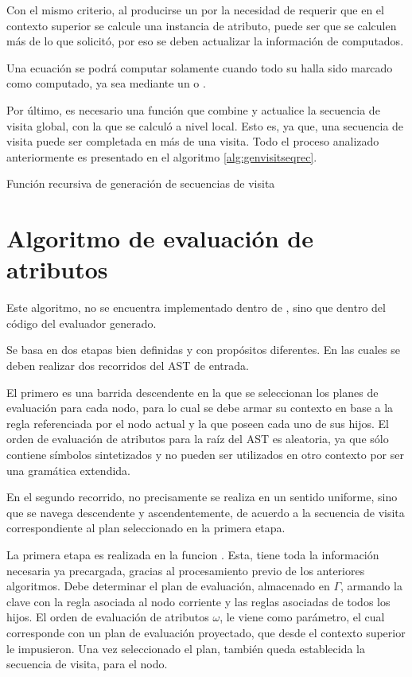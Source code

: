 Con el mismo criterio, al producirse un  por la necesidad de requerir que en el contexto superior se calcule una instancia de atributo, puede ser que se calculen más de lo que solicitó, por eso se deben actualizar la información de computados.

Una ecuación se podrá computar solamente cuando todo su  halla sido marcado como computado, ya sea mediante un  o .

Por último, es necesario una función que combine y actualice la secuencia de visita global, con la que se calculó a nivel local. Esto es, ya que, una secuencia de visita puede ser completada en más de una visita. Todo el proceso analizado anteriormente es presentado en el algoritmo \ref{alg:genvisitseqrec}.

\begin{algorithm}[!ht]

\caption{\label{alg:genvisitseqrec} Función recursiva de generación de secuencias de visita}
\end{algorithm}

\section{Algoritmo de evaluación de atributos}
\label{sec:algevalattr}

Este algoritmo, no se encuentra implementado dentro de \maggen, sino que dentro del código del evaluador generado.

Se basa en dos etapas bien definidas y con propósitos diferentes. En las cuales se deben realizar dos recorridos del AST de entrada.

El primero es una barrida descendente en la que se seleccionan los planes de evaluación para cada nodo, para lo cual se debe armar su contexto en base a la regla referenciada por el nodo actual y la que poseen cada uno de sus hijos. El orden de evaluación de atributos para la raíz del AST es aleatoria, ya que sólo contiene símbolos sintetizados y no pueden ser utilizados en otro contexto por ser una gramática extendida.

En el segundo recorrido, no precisamente se realiza en un sentido uniforme, sino que se navega descendente y ascendentemente, de acuerdo a la secuencia de visita correspondiente al plan seleccionado en la primera etapa. 

La primera etapa es realizada en la funcion . Esta, tiene toda la información necesaria ya precargada, gracias al procesamiento previo de los anteriores algoritmos. Debe determinar el plan de evaluación, almacenado en $\Gamma$, armando la clave con la regla asociada al nodo corriente y las reglas asociadas de todos los hijos. El orden de evaluación de atributos $\omega$, le viene como parámetro, el cual corresponde con un plan de evaluación proyectado, que desde el contexto superior le impusieron. Una vez seleccionado el plan, también queda establecida la secuencia de visita, para el nodo.

